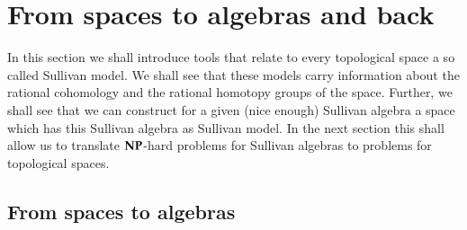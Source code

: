
 \section{From spaces to algebras and back} 
 In this section we shall introduce tools that relate to every topological space a so called Sullivan model. We shall see
 that these models carry information about the rational cohomology  and the rational homotopy
 groups of the space. Further, we shall see that we can construct for a given (nice enough) Sullivan algebra a space which
 has this Sullivan algebra as Sullivan model. In the next section this shall allow us to translate $\mathbf{NP}$-hard
 problems for Sullivan algebras to problems for topological spaces.
 \subsection{From spaces to algebras} \label{sec:FromSpacesToAlgebras}
 
